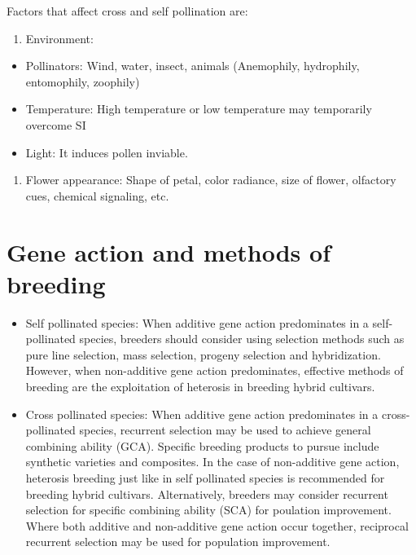 \documentclass[
]{book}
\providecommand{\tightlist}{%
  \setlength{\itemsep}{0pt}\setlength{\parskip}{0pt}}
\begin{document}
Factors that affect cross and self pollination are:

\begin{enumerate}
\def\labelenumi{\arabic{enumi}.}
\tightlist
\item
  Environment:
\end{enumerate}

\begin{itemize}
\tightlist
\item
  Pollinators: Wind, water, insect, animals (Anemophily, hydrophily, entomophily, zoophily)
\item
  Temperature: High temperature or low temperature may temporarily overcome SI
\item
  Light: It induces pollen inviable.
\end{itemize}

\begin{enumerate}
\def\labelenumi{\arabic{enumi}.}
\setcounter{enumi}{1}
\tightlist
\item
  Flower appearance: Shape of petal, color radiance, size of flower, olfactory cues, chemical signaling, etc.
\end{enumerate}

\hypertarget{gene-action-and-methods-of-breeding}{%
\chapter{Gene action and methods of breeding}\label{gene-action-and-methods-of-breeding}}

\begin{itemize}
\item
  Self pollinated species: When additive gene action predominates in a self-pollinated species, breeders should consider using selection methods such as pure line selection, mass selection, progeny selection and hybridization. However, when non-additive gene action predominates, effective methods of breeding are the exploitation of heterosis in breeding hybrid cultivars.
\item
  Cross pollinated species: When additive gene action predominates in a cross-pollinated species, recurrent selection may be used to achieve general combining ability (GCA). Specific breeding products to pursue include synthetic varieties and composites. In the case of non-additive gene action, heterosis breeding just like in self pollinated species is recommended for breeding hybrid cultivars. Alternatively, breeders may consider recurrent selection for specific combining ability (SCA) for poulation improvement. Where both additive and non-additive gene action occur together, reciprocal recurrent selection may be used for population improvement.
\end{itemize}
\end{document}
